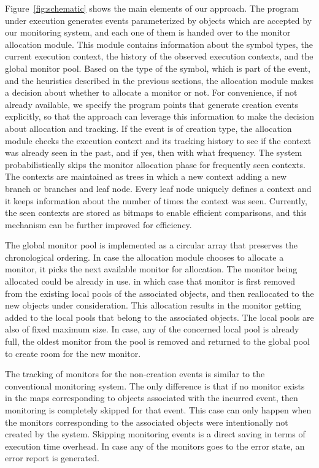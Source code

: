 Figure~\ref{fig:schematic} shows the main elements of our approach. The program 
under execution generates events parameterized by objects which are accepted by 
our monitoring system, and each one of them is handed over to the monitor 
allocation module. This module contains information about the symbol types, the current execution context, 
the history of the observed execution contexts, and the global monitor pool.
Based on the type of the symbol, which is part of the event, and the heuristics 
described in the previous sections, the allocation module makes a decision about whether to allocate a monitor or not.
For convenience, if not already available, we 
specify the program points that generate creation events explicitly, so that the 
approach can leverage this information to make the decision about allocation and tracking. 
If the event is of creation type, the allocation module checks the execution context and its 
tracking history to see if the context was already seen in the past, and if yes, 
then with what frequency. The system probabilistically skips the monitor 
allocation phase for frequently seen contexts. 
The contexts are maintained as trees in which a new context adding a new branch or branches and leaf node. 
Every leaf node uniquely defines a context and it keeps information about the 
number of times the context was seen. Currently, the seen contexts are stored as bitmaps to enable efficient
comparisons, and this mechanism can be further improved for efficiency.

The global monitor pool is implemented as a circular array that preserves 
the chronological ordering. In case the allocation module chooses to allocate a monitor,
it picks the next available monitor for allocation. The monitor being allocated could be already in use.
in which case that monitor is first removed from the existing local pools of the associated 
objects, and then reallocated to the new objects under consideration. This allocation results in the monitor
getting added to the local pools that belong to the associated objects. The local pools are also of fixed maximum size.
In case, any of the concerned local pool is already full, the oldest monitor from the pool is removed and returned to the global pool
to create room for the new monitor. 

The tracking of monitors for the non-creation events is similar to the 
conventional monitoring system. The only difference is that if no monitor exists in the maps 
corresponding to objects associated with the incurred event, then monitoring is completely 
skipped for that event. This case can only happen when the monitors corresponding to the 
associated objects were intentionally not created by the system. Skipping monitoring events is a 
direct saving in terms of execution time overhead. In case any of the monitors goes to the error state,
an error report is generated.



